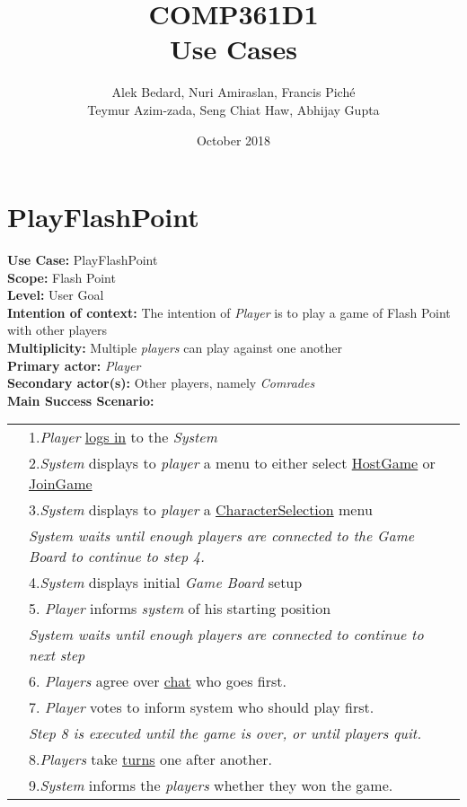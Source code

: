 \documentclass{article}
\title{COMP361D1\\Use Cases}
\author{Alek Bedard, Nuri Amiraslan, Francis Piché\\ Teymur Azim-zada, Seng Chiat Haw, Abhijay Gupta}
\date{October 2018}
\begin{document}
	
	\maketitle
	\section*{PlayFlashPoint}
	\textbf{Use Case: } PlayFlashPoint\\
	\textbf{Scope:} Flash Point\\
	\textbf{Level: }
	User Goal\\
	\textbf{Intention of context: }
	The intention of \textit{Player} is to play a game of Flash Point with other players\\
	\textbf{Multiplicity: }
	Multiple \textit{players} can play against one another\\
	\textbf{Primary actor: }
	\textit{Player}\\
	\textbf{Secondary actor(s):} Other players, namely \textit{Comrades}\\
	\textbf{Main Success Scenario:}\\
	\begin{tabular}{l l}
		&1.\textit{Player} \underline{logs in} to the \textit{System}\\
		&2.\textit{System} displays to \textit{player} a menu to either select \underline{HostGame} or \underline{JoinGame}\\
		&3.\textit{System} displays to \textit{player} a \underline{CharacterSelection} menu\\
		&\quad\textit{System waits until enough players are connected to the Game Board to continue to step 4.}\\
		&4.\textit{System} displays initial \textit{Game Board} setup\\
		&5. \textit{Player} informs \textit{system} of his starting position\\
		&\qquad\textit{System waits until enough players are connected to continue to next step}\\
		&6. \textit{Players} agree over \underline{chat} who goes first.\\
		&7. \textit{Player} votes to inform system who should play first.\\
		&\qquad\textit{Step 8 is executed until the game is over, or until players quit.}\\
		&8.\textit{Players} take \underline{turns} one after another.\\
		&9.\textit{System} informs the \textit{players} whether they won the game.
	\end{tabular}\\
\end{document}

